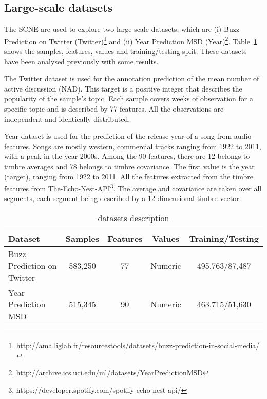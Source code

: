 \documentclass{article}
\begin{document}
\subsection{Large-scale datasets}
The SCNE are used to explore two large-scale datasets, which are 
(i) Buzz Prediction on Twitter (Twitter)\footnote{http://ama.liglab.fr/resourcestools/datasets/buzz-prediction-in-social-media/} and (ii) Year Prediction MSD (Year)\footnote{http://archive.ics.uci.edu/ml/datasets/YearPredictionMSD}. 
Table~\ref{Table_Data} shows the samples, features, values and training/testing split. 
These datasets have been analysed previously with some results. 

The Twitter dataset is used for the annotation prediction of the mean number of active discussion (NAD).
This target is a positive integer that describes the popularity of the sample's topic. 
Each sample covers weeks of observation for a specific topic and is described by 77 features. 
All the observations are independent and identically distributed.

Year dataset is used for the prediction of the release year of a song from audio features. 
Songs are mostly western, commercial tracks ranging from 1922 to 2011, with a peak in the year 2000s. 
Among the 90 features, there are 12 belongs to timbre averages and 78 belongs to timbre covariance. 
The first value is the year (target), ranging from 1922 to 2011. 
All the features extracted from the timbre features from The-Echo-Nest-API\footnote{https://developer.spotify.com/spotify-echo-nest-api/}. 
The average and covariance are taken over all segments, each segment being described by a 12-dimensional timbre vector. 

\begin{table}[!h]
\footnotesize 
\centering
\caption{datasets description}
\label{Table_Data}
\begin{tabular}{lcccc}
\hline 
Dataset & Samples & Features & \multicolumn{1}{c}{Values} & Training/Testing \\%
\hline 
Buzz Prediction on Twitter & 583,250 & 77 & Numeric &  495,763/87,487 \\ 
Year Prediction MSD & 515,345 & 90 & Numeric &  463,715/51,630\\ 
\hline 
\end{tabular} 
\end{table}
\end{document}
